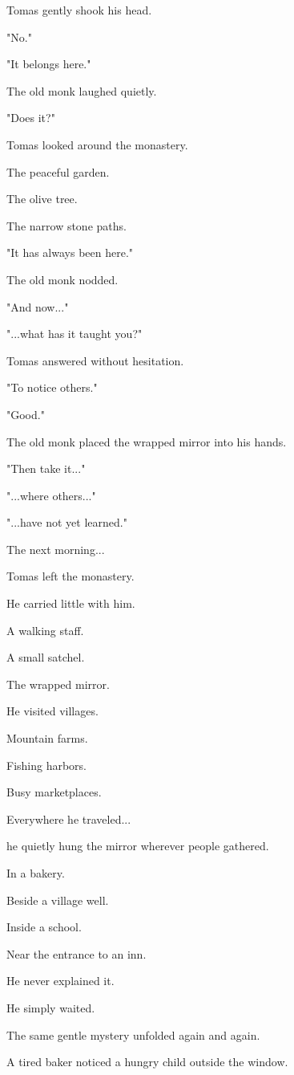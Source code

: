 \documentclass[12pt,openany]{book}
\begin{document}
Tomas gently shook his head.

"No."

"It belongs here."

The old monk laughed quietly.

"Does it?"

Tomas looked around the monastery.

The peaceful garden.

The olive tree.

The narrow stone paths.

"It has always been here."

The old monk nodded.

"And now..."

"...what has it taught you?"

Tomas answered without hesitation.

"To notice others."

"Good."

The old monk placed the wrapped mirror into his hands.

"Then take it..."

"...where others..."

"...have not yet learned."

The next morning...

Tomas left the monastery.

He carried little with him.

A walking staff.

A small satchel.

The wrapped mirror.

He visited villages.

Mountain farms.

Fishing harbors.

Busy marketplaces.

Everywhere he traveled...

he quietly hung the mirror wherever people gathered.

In a bakery.

Beside a village well.

Inside a school.

Near the entrance to an inn.

He never explained it.

He simply waited.

The same gentle mystery unfolded again and again.

A tired baker noticed a hungry child outside the window.
\end{document}

